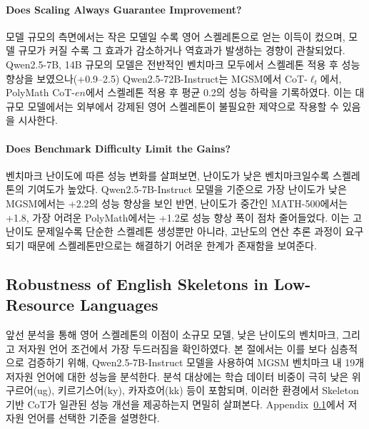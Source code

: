 
\paragraph{Does Scaling Always Guarantee Improvement?}
모델 규모의 측면에서는 작은 모델일 수록 영어 스켈레톤으로 얻는 이득이 컸으며, 모델 규모가 커질 수록 그 효과가 감소하거나 역효과가 발생하는 경향이 관찰되었다. Qwen2.5-7B, 14B 규모의 모델은 전반적인 벤치마크 모두에서 스켈레톤 적용 후 성능 향상을 보였으나(+0.9--2.5) Qwen2.5-72B-Instruct는 MGSM에서 CoT-$\ell_t$에서, PolyMath CoT-$en$에서 스켈레톤 적용 후 평균 0.2의 성능 하락을 기록하였다. 이는 대규모 모델에서는 외부에서 강제된 영어 스켈레톤이 불필요한 제약으로 작용할 수 있음을 시사한다.

\paragraph{Does Benchmark Difficulty Limit the Gains?}
벤치마크 난이도에 따른 성능 변화를 살펴보면, 난이도가 낮은 벤치마크일수록 스켈레톤의 기여도가 높았다. Qwen2.5-7B-Instruct 모델을 기준으로 가장 난이도가 낮은 MGSM에서는 +2.2의 성능 향상을 보인 반면, 난이도가 중간인 MATH-500에서는 +1.8, 가장 어려운 PolyMath에서는 +1.2로 성능 향상 폭이 점차 줄어들었다. 이는 고난이도 문제일수록 단순한 스켈레톤 생성뿐만 아니라, 고난도의 연산 추론 과정이 요구되기 때문에 스켈레톤만으로는 해결하기 어려운 한계가 존재함을 보여준다.

\subsection{Robustness of English Skeletons in Low-Resource Languages}

앞선 분석을 통해 영어 스켈레톤의 이점이 소규모 모델, 낮은 난이도의 벤치마크, 그리고 저자원 언어 조건에서 가장 두드러짐을 확인하였다. 본 절에서는 이를 보다 심층적으로 검증하기 위해, Qwen2.5-7B-Instruct 모델을 사용하여 MGSM 벤치마크 내 19개 저자원 언어에 대한 성능을 분석한다. 분석 대상에는 학습 데이터 비중이 극히 낮은 위구르어(ug), 키르기스어(ky), 카자흐어(kk) 등이 포함되며, 이러한 환경에서 Skeleton 기반 CoT가 일관된 성능 개선을 제공하는지 면밀히 살펴본다. Appendix~\ref{}에서 저자원 언어를 선택한 기준을 설명한다.

